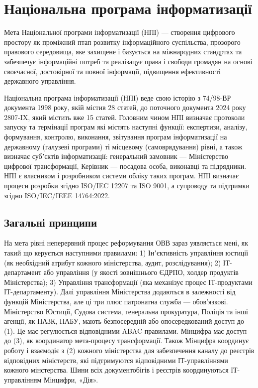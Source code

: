 \chapter{Національна програма інформатизації}

Мета Національної програми інформатизації (НПІ) --- створення цифрового простору як
проміжний птап розвитку інформаційного суспільства, прозорого правового середовища,
яке захищене і базується на міжнародних стандртах та забезпечує інформаційні потреб та
реалізацує права і свободи громадян на основі своєчасної, достовірної та повної інформації,
підвищення ефективності державного управління.

Національна програма інформатизації (НПІ) веде свою історію з 74/98-ВР документа 1998 року,
якій містив 28 статей, до поточного документа 2024 року 2807-IX, який містить вже 15 статей.
Головним чином НПІ визначає протоколи запуску та термінації програм які містять наступні функції:
експертизи, аналізу, формування, контролю, виконання, звітування програм інформатизації
на державному (галузеві програми) ті місцевому (самоврядування) рівні, а також визначає
субʼєктів інформатизації: генеральний замовник --- Міністерство цифрової трансформації,
Керівник --- посадова особа, виконавці та підрядники. НПІ є власником і розробником
системи обліку таких програм. НПІ визначає процеси розробки згідно ISO/IEC 12207 та ISO 9001,
а супроводу та підтримки згідно ISO/IEC/IEEE 14764:2022.

\section{Загальні принципи}

На мета рівні неперервний процес реформування ОВВ зараз уявляється мені,
як такий що керується наступними правилами: 1) Інʼєктивність управління
юстиції (як необхідний атрибут кожного міністерства, аудит, розслідування);
2) ІТ-департамент або управління (у якості зовнішнього ЄДРПО, холдер продуктів
Міністерства); 3) Управління трансформації (яка механізує процес ІТ-продуктами
ІТ-департаменту). Далі управління Міністерства додаються в залежності від
функцій Міністерства, але ці три плюс патронатна служба — обов’язкові.
Міністерство Юстиції, Судова система, генеральна прокуратура, Поліція
та інші агенції, як НАЗК, НАБУ, мають безпосередній або опосередкований
доступ до (1). Це має регулюється відповідними ABAC правилами. Мінцифра
має доступ до (3), як координатор мета-процесу трансформації. Також
Мінцифра координує роботу і взаємодіє з (2) кожного міністерства для
забезпечення каналу до реєстрів відповідних міністерств, які підтримуются
відповідними ІТ-управліннями кожного мінстерства. Шини всіх документобігів
і реєстрів координуються ІТ-управлінням Мінцифри, «Дія».

